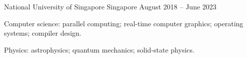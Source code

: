\begin{cventries}
	{National University of Singapore} %
	{Singapore} %
	{August 2018 -- June 2023} %
	{
		\begin{cvitems} %
			\item Computer science: parallel computing; real-time computer graphics; operating systems; compiler design.
			\item Physics: astrophysics; quantum mechanics; solid-state physics.
		\end{cvitems}
	}

\end{cventries}
